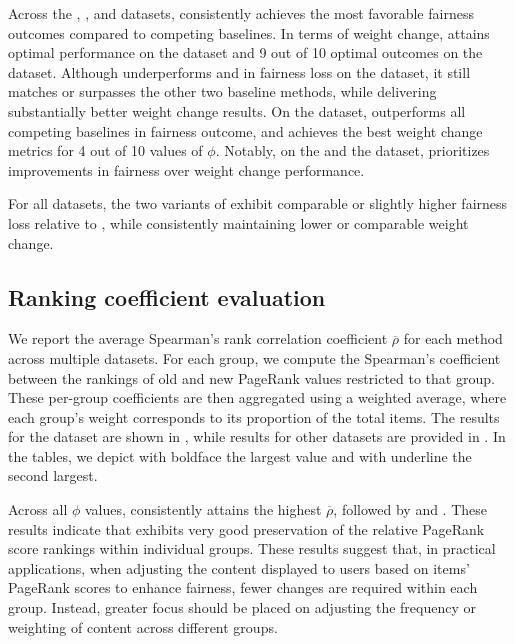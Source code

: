 \documentclass[sigconf, anonymous, review]{acmart}
\begin{document}
Across the \book, \blogs, and \mind datasets, \crossgd consistently achieves the most favorable fairness outcomes compared to competing baselines. In terms of weight change, \crossgd attains optimal performance on the \book dataset and 9 out of 10 optimal outcomes on the \mind dataset. Although \crossgd underperforms \lfpru and \lfprn in fairness loss on the \twitter dataset, it still matches or surpasses the other two baseline methods, while delivering substantially better weight change results. On the \slashdot dataset, \crossgd outperforms all competing baselines in fairness outcome, and achieves the best weight change metrics for 4 out of 10 values of $\phi$. Notably, on the \blogs and the \slashdot dataset, \crossgd prioritizes improvements in fairness over weight change performance.

For all datasets, the two variants of \crossgd exhibit comparable or slightly higher fairness loss relative to \crossgd, while consistently maintaining lower or comparable weight change.

\subsection{Ranking coefficient evaluation}
We report the average Spearman’s rank correlation coefficient $\overline{\rho}$ for each method across multiple datasets. For each group, we compute the Spearman’s coefficient between the rankings of old and new PageRank values restricted to that group. These per-group coefficients are then aggregated using a weighted average, where each group’s weight corresponds to its proportion of the total items. The results for the \mind dataset are shown in , while results for other datasets are provided in 
.
In the tables, we depict with boldface the largest value and with underline the second largest.

Across all $\phi$ values, \fairgd consistently attains the highest $\overline{\rho}$, followed by \fairgdrtwo and \fairgdrone.
These results indicate that \fairgd exhibits very good preservation of the relative PageRank score rankings within individual groups. These results suggest that, in practical applications, when adjusting the content displayed to users based on items’ PageRank scores to enhance fairness, fewer changes are required within
each group. Instead, greater focus should be placed on adjusting
the frequency or weighting of content across different groups.
\end{document}
